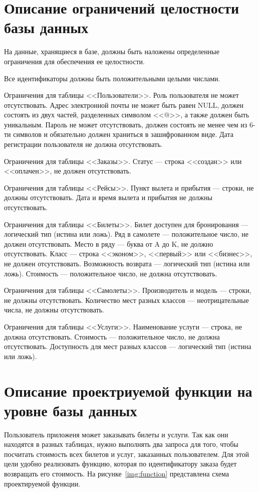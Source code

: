 \documentclass{bmstu}
\begin{document}
\section{Описание ограничений целостности базы данных}

На данные, хранящиеся в базе, должны быть наложены определенные ограничения для обеспечения ее целостности.

Все идентификаторы должны быть положительными целыми числами.

Ограничения для таблицы <<Пользователи>>. 
Роль пользователя не может отсутствовать.
Адрес электронной почты не может быть равен NULL, должен состоять из двух частей, разделенных символом <<@>>, а также должен быть уникальным. 
Пароль не может отсутствовать, должен состоять не менее чем из 6-ти символов и обязательно должен храниться в зашифрованном виде. 
Дата регистрации пользователя не должна отсутствовать.

Ограничения для таблицы <<Заказы>>. 
Статус --- строка <<создан>> или <<оплачен>>, не должен отсутствовать.

Ограничения для таблицы <<Рейсы>>. 
Пункт вылета и прибытия --- строки, не должны отсутствовать. 
Дата и время вылета и прибытия не должны отсутствовать. 

Ограничения для таблицы <<Билеты>>. 
Билет доступен для бронирования --- логический тип (истина или ложь). 
Ряд в самолете --- положительное число, не должен отсутствовать. 
Место в ряду --- буква от A до K, не должно отсутствовать. 
Класс --- строка <<эконом>>, <<первый>> или <<бизнес>>, не должен отсутствовать. 
Возможность возврата --- логический тип (истина или ложь). 
Стоимость --- положительное число, не должна отсутствовать.

Ограничения для таблицы <<Самолеты>>. 
Производитель и модель --- строки, не должны отсутствовать. 
Количество мест разных классов --- неотрицательные числа, не должны отсутствовать. 

Ограничения для таблицы <<Услуги>>. 
Наименование услуги --- строка, не должна отсутствовать. 
Стоимость --- положительное число, не должна отсутствовать.
Доступность для мест разных классов --- логический тип (истина или ложь).

\pagebreak
\section{Описание проектриуемой функции на уровне базы данных}

Пользователь приложеня может заказывать билеты и услуги. 
Так как они находятся в разных таблицах, нужно выполнять два запроса для того, чтобы посчитать стоимость всех билетов и услуг, заказанных пользователем. 
Для этой цели удобно реализовать функцию, которая по идентификатору заказа будет возвращать его стоимость. 
На рисунке~\ref{img:function} представлена схема проектируемой функции.
\end{document}
